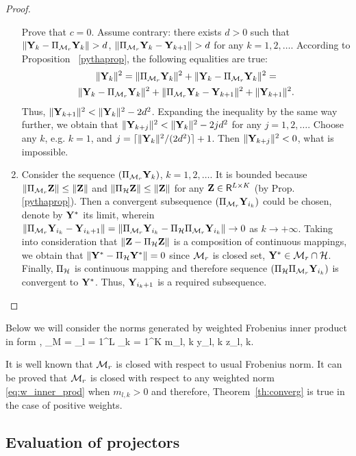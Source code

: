 \documentclass[sii]{ipart}
\begin{document}
\begin{proof}
\begin{enumerate}
		Prove that $c = 0$. Assume contrary: there exists $d > 0$ such that $\|\mathbf{Y}_k - \Pi_{\mathcal{M}_r} \mathbf{Y}_k\| > d$, $\|\Pi_{\mathcal{M}_r} \mathbf{Y}_k - \mathbf{Y}_{k + 1}\| > d$ for any $k = 1, 2, \ldots$. According to Proposition ~\ref{pythaprop}, the following equalities are true:
		\begin{multline*}
		\|\bfY_k\|^2 = \|\Pi_{\calM_r} \bfY_k\|^2 + \|\bfY_k - \Pi_{\calM_r} \bfY_k\|^2 =\\ \|\bfY_k - \Pi_{\calM_r} \bfY_k\|^2 + \|\Pi_{\calM_r} \bfY_k - \bfY_{k + 1}\|^2 + \|\bfY_{k + 1}\|^2.
		\end{multline*}
		Thus, $\|\mathbf{Y}_{k+1}\|^2 < \|\mathbf{Y}_k\|^2 - 2d^2$. Expanding the inequality by the same way further, we obtain that $\|\mathbf{Y}_{k+j}\|^2 < \|\mathbf{Y}_k\|^2 - 2 j d^2$ for any $j = 1, 2, \ldots$. Choose any $k$, e.g. $k = 1$, and $j = \lceil \|\mathbf{Y}_k\|^2 / (2d^2) \rceil + 1$. Then $\|\mathbf{Y}_{k+j}\|^2 < 0$, what is impossible.
		\item Consider the sequence $(\Pi_{\mathcal{M}_r} \mathbf{Y}_k)$, $k = 1, 2, \ldots$. It is bounded because $\|\Pi_{\mathcal{M}_r} \mathbf{Z}\| \le \|\mathbf{Z}\|$ and $\|\Pi_{\mathcal{H}} \mathbf{Z}\| \le \|\mathbf{Z}\|$ for any $\mathbf{Z} \in \mathsf{R}^{L \times K}$ (by Prop. \ref{pythaprop}). Then a convergent subsequence $(\Pi_{\mathcal{M}_r} \mathbf{Y}_{i_k})$ could be chosen, denote by $\mathbf{Y}^*$ its limit, wherein $\|\Pi_{\mathcal{M}_r} \mathbf{Y}_{i_k} - \mathbf{Y}_{i_k + 1}\| = \|\Pi_{\mathcal{M}_r} \mathbf{Y}_{i_k} - \Pi_{\mathcal{H}} \Pi_{\mathcal{M}_r} \mathbf{Y}_{i_k}\| \to 0$ as $k \to + \infty$. Taking into consideration that $\|\mathbf{Z} - \Pi_{\mathcal{H}} \mathbf{Z}\|$ is a composition of continuous mappings, we obtain that $\|\mathbf{Y}^* - \Pi_{\mathcal{H}} \mathbf{Y}^*\| = 0$ since $\mathcal{M}_r$ is closed set, $\mathbf{Y}^* \in \mathcal{M}_r \cap \mathcal{H}$. Finally, $\Pi_{\mathcal{H}}$ is continuous mapping and therefore sequence $(\Pi_{\mathcal{H}} \Pi_{\mathcal{M}_r} \mathbf{Y}_{i_k})$ is convergent to $\mathbf{Y}^*$. Thus, $\mathbf{Y}_{i_k + 1}$ is a required subsequence.
	\end{enumerate}
\end{proof}

Below we will consider the norms generated by weighted Frobenius inner product in form
\be
\label{eq:w_inner_prod}
\langle\bfY, \bfZ\rangle_M = \sum_{l = 1}^L \sum_{k = 1}^K m_{l, k} y_{l, k} z_{l, k}.
\ee

It is well known that $\mathcal{M}_r$ is closed with respect to usual Frobenius norm. It can be proved that $\mathcal{M}_r$ is closed with respect to any weighted norm \eqref{eq:w_inner_prod} when $m_{l,k} > 0$ and therefore, Theorem~\ref{th:converg} is true in the case of positive weights.


\subsection{Evaluation of projectors}
\end{document}
